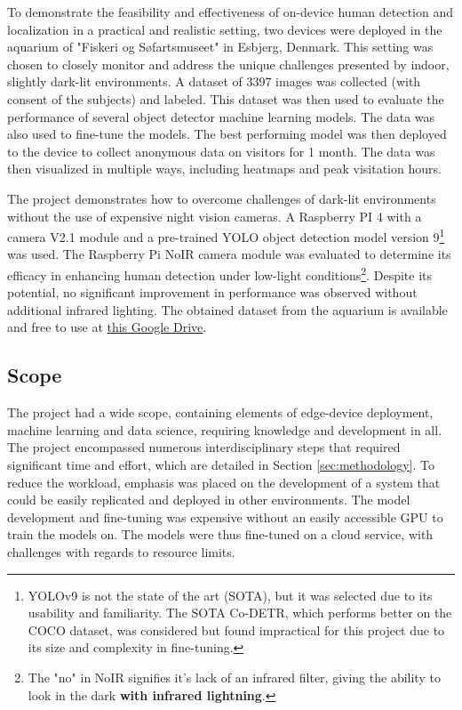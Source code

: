 To demonstrate the feasibility and effectiveness of on-device human detection and localization in a practical and realistic setting, two devices were deployed in the aquarium of "Fiskeri og Søfartsmuseet" in Esbjerg, Denmark. This setting was chosen to closely monitor and address the unique challenges presented by indoor, slightly dark-lit environments. A dataset of 3397 images 
was collected (with consent of the subjects) and labeled. This dataset was then used to evaluate the performance of several object detector machine learning models. The data was also used to fine-tune the models. The best performing model was then deployed to the device to collect anonymous data on visitors for 1 month. The data was then visualized in multiple ways, including heatmaps and peak visitation hours. 

The project demonstrates how to overcome challenges of dark-lit environments without the use of expensive night vision cameras. A Raspberry PI 4 with a camera V2.1 module and a pre-trained YOLO object detection model version 9\footnote{YOLOv9 is not the state of the art (SOTA), but it was selected due to its usability and familiarity. The SOTA Co-DETR, which performs better on the COCO dataset, was considered but found impractical for this project due to its size and complexity in fine-tuning.} was used. The Raspberry Pi NoIR camera module was evaluated to determine its efficacy in enhancing human detection under low-light conditions\footnote{The "no" in NoIR signifies it's lack of an infrared filter, giving the ability to look in the dark \textbf{with infrared lightning}.}. Despite its potential, no significant improvement in performance was observed without additional infrared lighting. The obtained dataset from the aquarium is available and free to use at \href{https://drive.google.com/drive/folders/1_JXkpCqhaTc95XMjBc--Bkt0tH0Kdp-4?usp=sharing}{this Google Drive}.




\subsection{Scope}
The project had a wide scope, containing elements of edge-device deployment, machine learning and data science, requiring knowledge and development in all. The project encompassed numerous interdisciplinary steps that required significant time and effort, which are detailed in Section \ref{sec:methodology}. To reduce the workload, emphasis was placed on the development of a system that could be easily replicated and deployed in other environments. The model development and fine-tuning was expensive without an easily accessible GPU to train the models on. The models were thus fine-tuned on a cloud service, with challenges with regards to resource limits.  

